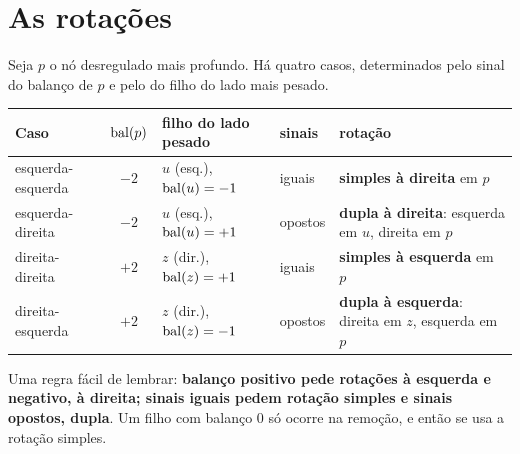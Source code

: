 \section{As rotações}\label{sec:rotacoes}
Seja $p$ o nó desregulado mais profundo. Há quatro casos, determinados pelo sinal do balanço de $p$ e pelo do filho do lado mais pesado.
\begin{center}
\small
\begin{tabularx}{\linewidth}{@{}lcllX@{}}
\toprule
Caso & $\operatorname{bal}(p)$ & filho do lado pesado & sinais & rotação\\
\midrule
esquerda-esquerda & $-2$ & $u$ (esq.), $\operatorname{bal}(u)=-1$ & iguais & \textbf{simples à direita}\index{rotacao@rotação!simples} em $p$\\
esquerda-direita & $-2$ & $u$ (esq.), $\operatorname{bal}(u)=+1$ & opostos & \textbf{dupla à direita}\index{rotacao@rotação!dupla}: esquerda em $u$, direita em $p$\\
direita-direita & $+2$ & $z$ (dir.), $\operatorname{bal}(z)=+1$ & iguais & \textbf{simples à esquerda} em $p$\\
direita-esquerda & $+2$ & $z$ (dir.), $\operatorname{bal}(z)=-1$ & opostos & \textbf{dupla à esquerda}: direita em $z$, esquerda em $p$\\
\bottomrule
\end{tabularx}
\end{center}
Uma regra fácil de lembrar: \textbf{balanço positivo pede rotações à esquerda e negativo, à direita; sinais iguais pedem rotação simples e sinais opostos, dupla}. Um filho com balanço 0 só ocorre na remoção, e então se usa a rotação simples.

